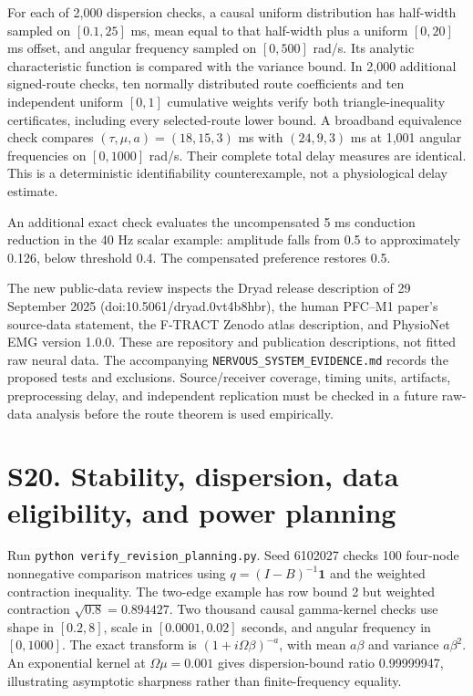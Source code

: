\documentclass[11pt,a4paper]{article}
\begin{document}
For each of 2,000 dispersion checks, a causal uniform distribution has half-width sampled on $[0.1,25]$ ms, mean equal to that half-width plus a uniform $[0,20]$ ms offset, and angular frequency sampled on $[0,500]$ rad/s. Its analytic characteristic function is compared with the variance bound. In 2,000 additional signed-route checks, ten normally distributed route coefficients and ten independent uniform $[0,1]$ cumulative weights verify both triangle-inequality certificates, including every selected-route lower bound. A broadband equivalence check compares $(\tau,\mu,a)=(18,15,3)$ ms with $(24,9,3)$ ms at 1,001 angular frequencies on $[0,1000]$ rad/s. Their complete total delay measures are identical. This is a deterministic identifiability counterexample, not a physiological delay estimate.

An additional exact check evaluates the uncompensated 5 ms conduction reduction in the 40 Hz scalar example: amplitude falls from 0.5 to approximately 0.126, below threshold 0.4. The compensated preference restores 0.5.

The new public-data review inspects the Dryad release description of 29 September 2025 (doi:10.5061/dryad.0vt4b8hbr), the human PFC--M1 paper's source-data statement, the F-TRACT Zenodo atlas description, and PhysioNet EMG version 1.0.0. These are repository and publication descriptions, not fitted raw neural data. The accompanying \texttt{NERVOUS\_SYSTEM\_EVIDENCE.md} records the proposed tests and exclusions. Source/receiver coverage, timing units, artifacts, preprocessing delay, and independent replication must be checked in a future raw-data analysis before the route theorem is used empirically.

\section*{S20. Stability, dispersion, data eligibility, and power planning}
Run \texttt{python verify\_revision\_planning.py}. Seed 6102027 checks 100 four-node nonnegative comparison matrices using $q=(I-B)^{-1}\mathbf1$ and the weighted contraction inequality. The two-edge example has row bound 2 but weighted contraction $\sqrt{0.8}=0.894427$. Two thousand causal gamma-kernel checks use shape in $[0.2,8]$, scale in $[0.0001,0.02]$ seconds, and angular frequency in $[0,1000]$. The exact transform is $(1+i\Omega\beta)^{-a}$, with mean $a\beta$ and variance $a\beta^2$. An exponential kernel at $\Omega\mu=0.001$ gives dispersion-bound ratio 0.99999947, illustrating asymptotic sharpness rather than finite-frequency equality.
\end{document}
